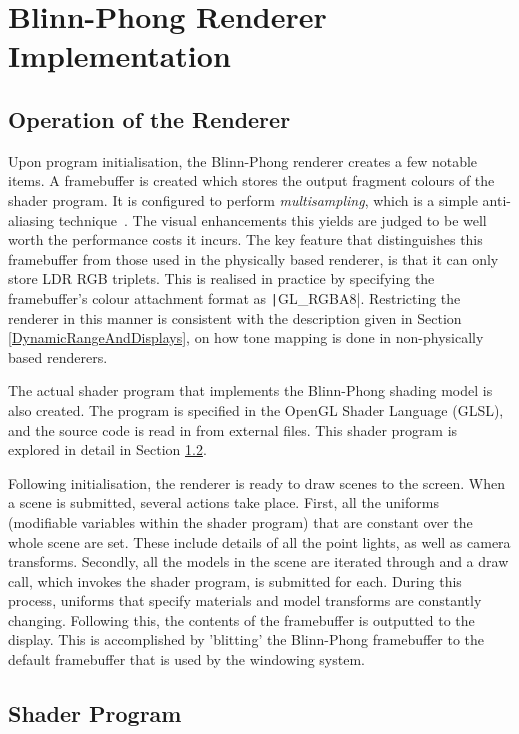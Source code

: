 \section{Blinn-Phong Renderer Implementation} \label{BlinnPhongImplementation}

\subsection{Operation of the Renderer}

Upon program initialisation, the Blinn-Phong renderer creates a few notable items. A framebuffer is created which stores the output fragment colours of the shader program. It is configured to perform \textit{multisampling}, which is a simple anti-aliasing technique~\cite{RealityEngine}. The visual enhancements this yields are judged to be well worth the performance costs it incurs. The key feature that distinguishes this framebuffer from those used in the physically based renderer, is that it can only store LDR RGB triplets. This is realised in practice by specifying the framebuffer's colour attachment format as \texttt|GL_RGBA8|. Restricting the renderer in this manner is consistent with the description given in Section \ref{DynamicRangeAndDisplays}, on how tone mapping is done in non-physically based renderers.

The actual shader program that implements the Blinn-Phong shading model is also created. The program is specified in the OpenGL Shader Language (GLSL), and the source code is read in from external files. This shader program is explored in detail in Section \ref{BlinnPhongRendererShaderProgram}.

Following initialisation, the renderer is ready to draw scenes to the screen. When a scene is submitted, several actions take place. First, all the uniforms (modifiable variables within the shader program) that are constant over the whole scene are set. These include details of all the point lights, as well as camera transforms. Secondly, all the models in the scene are iterated through and a draw call, which invokes the shader program, is submitted for each. During this process, uniforms that specify materials and model transforms are constantly changing. Following this, the contents of the framebuffer is outputted to the display. This is accomplished by 'blitting' the Blinn-Phong framebuffer to the default framebuffer that is used by the windowing system.

\subsection{Shader Program} \label{BlinnPhongRendererShaderProgram}

